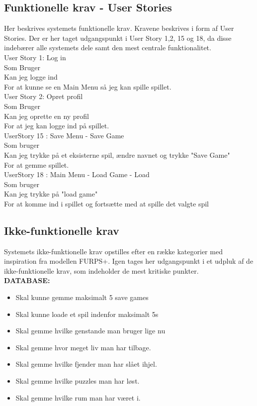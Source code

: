 \subsection{Funktionelle krav - User Stories}
Her beskrives systemets funktionelle krav. Kravene beskrives i form af User Stories. Der er her taget udgangspunkt i User Story 1,2, 15 og 18, da disse indebærer alle systemets dele samt den mest centrale funktionalitet.\\  
 
User Story 1: Log in \\
  Som Bruger \\
  Kan jeg logge ind \\
  For at kunne se en Main Menu så jeg kan spille spillet. \\
  
User Story 2: Opret profil \\
  Som Bruger \\
  Kan jeg oprette en ny profil \\
  For at jeg kan logge ind på spillet. \\
  
UserStory 15 : Save Menu - Save Game\\
  Som bruger \\
  Kan jeg trykke på et eksisterne spil, ændre navnet og trykke "Save Game" \\
  For at gemme spillet.\\

  
UserStory 18 : Main Menu - Load Game - Load\\
  Som bruger \\
  Kan jeg trykke på "load game" \\
  For at komme ind i spillet og fortsætte med at spille det valgte spil\\


\subsection{Ikke-funktionelle krav}
Systemets ikke-funktionelle krav opstilles efter en række kategorier med inspiration fra modellen FURPS+. Igen tages her udgangspunkt i et udpluk af de ikke-funktionelle krav, som indeholder de mest kritiske punkter.\\

\textbf{DATABASE:}

\begin{itemize}

\item Skal kunne gemme maksimalt 5 save games
\item Skal kunne loade et spil indenfor maksimalt 5s
\item Skal gemme hvilke genstande man bruger lige nu
\item Skal gemme hvor meget liv man har tilbage.
\item Skal gemme hvilke fjender man har slået ihjel.
\item Skal gemme hvilke puzzles man har løst.
\item Skal gemme hvilke rum man har været i.
\end{itemize}

